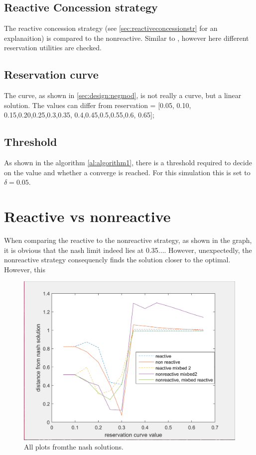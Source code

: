 \subsection{Reactive Concession strategy}
The reactive concession strategy (see \cref{sec:reactiveconcessionstr} for an explanaition) is compared to the nonreactive. Similar to \citet{zheng2015automated}, however here different reservation utilities are checked.

\subsection{Reservation curve}
The curve, as shown in \cref{sec:design:negmod}, is not really a curve, but a linear solution. The values can differ from 	
reservation = [0.05, 0.10, 0.15,0.20,0.25,0.3,0.35, 0.4,0.45,0.5,0.55,0.6, 0.65];

\subsection{Threshold}
As shown in the algorithm \cref{al:algorithm1}, there is a threshold required to decide on the value and whether a converge is reached. For this simulation this is set to $\delta = 0.05$.	

\section{Reactive vs nonreactive}
When comparing the reactive to the nonreactive strategy, as shown in the graph, it is obvious that the nash limit indeed lies at 0.35.... However, unexpectedly, the nonreactive strategy consequencly finds the solution closer to the optimal. However, this 

\begin{figure}
	\centering
	\includegraphics[width=0.7\linewidth]{img/all_dist_from_nash_solutions}
	\caption{All plots fromthe nash solutions.}
	\label{fig:alldistfromnashsolutions}
\end{figure}


